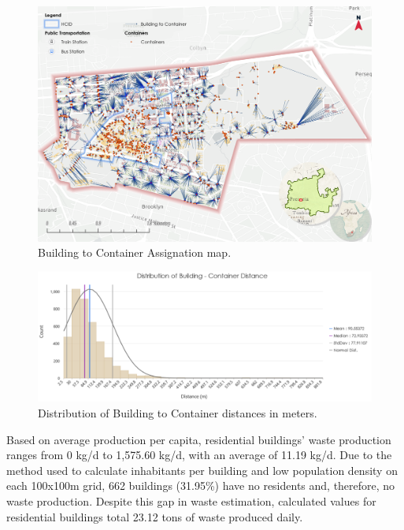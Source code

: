 \documentclass[authoryear,preprint,review,11pt,doubleblind]{elsarticle}
\begin{document}
    \begin{figure}[!ht]
    \centering
    \includegraphics[width=1.2\linewidth]{Figures/Building to Container.png}
        \caption{Building to Container Assignation map.}
        \label{fig:closestCont}
    \end{figure}

    \begin{figure}[h!]
    \centering
        \includegraphics[width=\linewidth]{Figures/Building to container distance.png}
        \caption{Distribution of Building to Container distances in meters.}
        \label{fig:distances}
    \end{figure}

    Based on average production per capita, residential buildings' waste production ranges from 0 kg/d to 1,575.60 kg/d, with an average of 11.19 kg/d. Due to the method used to calculate inhabitants per building and low population density on each 100x100m grid, 662 buildings (31.95\%) have no residents and, therefore, no waste production. Despite this gap in waste estimation, calculated values for residential buildings total 23.12 tons of waste produced daily.
\end{document}
